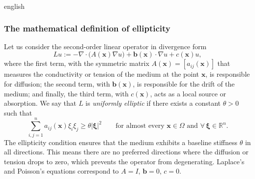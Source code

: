 \documentclass[12pt,letterpaper,twoside]{book}
\newcommand{\abs}[1]{\left\lvert #1 \right\rvert}
\begin{document}
\begin{hyphenrules}{english}
\subsubsection{The mathematical definition of ellipticity}
Let us consider the second-order linear operator in divergence form
\begin{equation}
  Lu:=-\nabla\cdot\big(A(\mathbf{x})\nabla u\big)+\mathbf{b}(\mathbf{x})\cdot\nabla u+c(\mathbf{x})u,
  \label{eq:elliptic-op}
\end{equation}
where the first term, with the symmetric matrix $A(\mathbf{x})=[a_{ij}(\mathbf{x})]$ that measures the conductivity or
tension of the medium at the point $\mathbf{x}$, is responsible for diffusion; the second term,
with $\mathbf{b}(\mathbf{x})$, is responsible for the drift of the medium; and finally, the third term, with $c(\mathbf{x})$,
acts as a local source or absorption. We say that $L$ is \emph{uniformly elliptic} if there exists a
constant $\theta>0$ such that
\begin{equation}
  \sum_{i,j=1}^{n}a_{ij}(\mathbf{x})\xi_i\xi_j\ge\theta\abs{\bm\xi}^2\qquad
  \text{for almost every }\mathbf{x}\in\Omega\text{ and }\forall\,\bm\xi\in\mathbb{R}^n.
  \label{eq:uniform-ellipticity}
\end{equation}
The ellipticity condition ensures that the medium exhibits a baseline stiffness $\theta$ in all
directions. This means there are no preferred directions where the diffusion or tension drops to zero,
which prevents the operator from degenerating. Laplace's and Poisson's equations correspond to $A=I$,
$\mathbf{b}=0$, $c=0$.


\end{hyphenrules}
\end{document}
